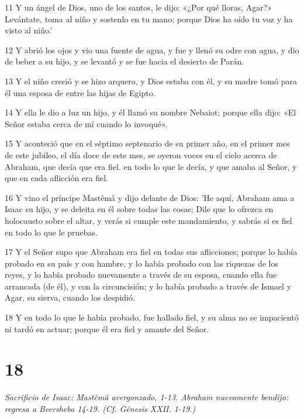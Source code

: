\par 11 Y un ángel de Dios, uno de los santos, le dijo: «¿Por qué lloras, Agar?» Levántate, toma al niño y sostenlo en tu mano; porque Dios ha oído tu voz y ha visto al niño.'
\par 12 Y abrió los ojos y vio una fuente de agua, y fue y llenó su odre con agua, y dio de beber a su hijo, y se levantó y se fue hacia el desierto de Parán.
\par 13 Y el niño creció y se hizo arquero, y Dios estaba con él, y su madre tomó para él una esposa de entre las hijas de Egipto.
\par 14 Y ella le dio a luz un hijo, y él llamó su nombre Nebaiot; porque ella dijo: «El Señor estaba cerca de mí cuando lo invoqué».
\par 15 Y aconteció que en el séptimo septenario de su primer año, en el primer mes de este jubileo, el día doce de este mes, se oyeron voces en el cielo acerca de Abraham, que decía que era fiel. en todo lo que le decía, y que amaba al Señor, y que en cada aflicción era fiel.
\par 16 Y vino el príncipe Mastêmâ y dijo delante de Dios: 'He aquí, Abraham ama a Isaac su hijo, y se deleita en él sobre todas las cosas; Dile que lo ofrezca en holocausto sobre el altar, y verás si cumple este mandamiento, y sabrás si es fiel en todo lo que le pruebas.
\par 17 Y el Señor supo que Abraham era fiel en todas sus aflicciones; porque lo había probado en su país y con hambre, y lo había probado con las riquezas de los reyes, y lo había probado nuevamente a través de su esposa, cuando ella fue arrancada (de él), y con la circuncisión; y lo había probado a través de Ismael y Agar, su sierva, cuando los despidió.
\par 18 Y en todo lo que le había probado, fue hallado fiel, y su alma no se impacientó ni tardó en actuar; porque él era fiel y amante del Señor.

\chapter{18}

\par \textit{Sacrificio de Isaac: Mastêmâ avergonzado, 1-13. Abraham nuevamente bendijo: regresa a Beersheba 14-19. (Cf. Génesis XXII. 1-19.)}

